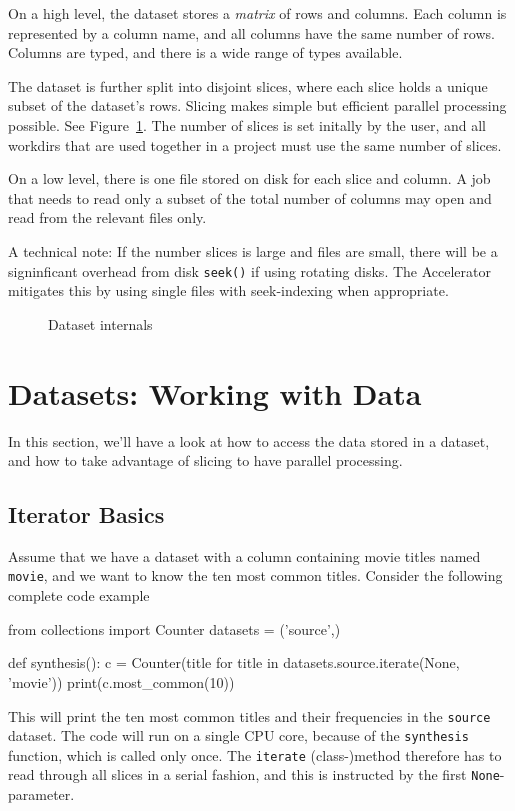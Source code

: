 \documentclass[a4paper]{article}
\begin{document}
On a high level, the dataset stores a \textsl{matrix} of rows and
columns.  Each column is represented by a column name, and all columns
have the same number of rows.  Columns are typed, and there is a wide
range of types available.

The dataset is further split into disjoint slices, where each slice
holds a unique subset of the dataset's rows.  Slicing makes simple but
efficient parallel processing possible.  See Figure~\ref{fig:slices}.
The number of slices is set initally by the user, and all workdirs
that are used together in a project must use the same number of
slices.

On a low level, there is one file stored on disk for each slice and
column.  A job that needs to read only a subset of the total number of
columns may open and read from the relevant files only.

A technical note: If the number slices is large and files are small,
there will be a signinficant overhead from disk \texttt{seek()} if
using rotating disks.  The Accelerator mitigates this by using single
files with seek-indexing when appropriate.


\begin{figure}[h!]
  \begin{center}
    
    \caption{Dataset internals}
    \label{fig:slices}
  \end{center}
\end{figure}

\clearpage



\section{Datasets: Working with Data}

In this section, we'll have a look at how to access the data stored in
a dataset, and how to take advantage of slicing to have parallel
processing.

\subsection{Iterator Basics}

Assume that we have a dataset with a column containing movie titles
named \texttt{movie}, and we want to know the ten most common titles.
Consider the following complete code example
\begin{python}
from collections import Counter
datasets = ('source',)

def synthesis():
    c = Counter(title for title in datasets.source.iterate(None, 'movie'))
    print(c.most_common(10))
\end{python}
This will print the ten most common titles and their
frequencies in the \texttt{source} dataset.  The code will run on a
single CPU core, because of the \texttt{synthesis} function, which is
called only once.  The \texttt{iterate} (class-)method therefore has
to read through all slices in a serial fashion, and this is instructed
by the first \texttt{None}-parameter.
\end{document}
